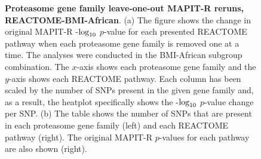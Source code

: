 \documentclass[10pt,a4paper]{article}
\def\log{{\rm log}}
\begin{document}
\begin{figure}[ht]
\caption[TBD]{\textbf{Proteasome gene family leave-one-out MAPIT-R reruns, REACTOME-BMI-African}. (a) The figure shows the change in original MAPIT-R -$\log_{10}$ $p$-value for each presented REACTOME pathway when each proteasome gene family is removed one at a time. The analyses were conducted in the BMI-African subgroup combination. The $x$-axis shows each proteasome gene family and the $y$-axis shows each REACTOME pathway. Each column has been scaled by the number of SNPs present in the given gene family and, as a result, the heatplot specifically shows the -$\log_{10}$ $p$-value change per SNP. (b) The table shows the number of SNPs that are present in each proteasome gene family (left) and each REACTOME pathway (right). The original MAPIT-R $p$-values for each pathway are also shown (right).}
\label{InterPath-Supp-Figure-Prot-Heatplots-African}
\end{figure}
\clearpage
\addtocounter{figure}{-1}
\addtocounter{CharNumber5}{1}

\end{document}
